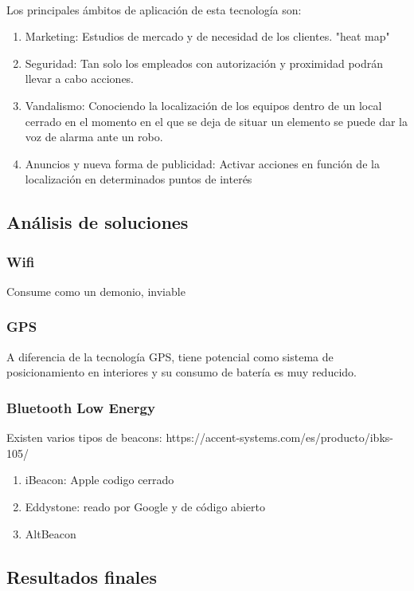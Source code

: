 \documentclass[a4paper ,12pt, onecolumn]{article}
\begin{document}
        \paragraph{}
        Los principales ámbitos de aplicación de esta tecnología son:
        \begin{enumerate}
            \item Marketing: Estudios de mercado y de necesidad de los clientes. "heat map"
            \item Seguridad: Tan solo los empleados con autorización y proximidad podrán llevar a cabo acciones.
            \item Vandalismo: Conociendo la localización de los equipos dentro de un local cerrado en el momento 
            en el que se deja de situar un elemento se puede dar la voz de alarma ante un robo.
            \item Anuncios y nueva forma de publicidad: Activar acciones en función de la localización en determinados puntos de interés
        \end{enumerate}
    \subsection{Análisis de soluciones}
        \subsubsection {Wifi}
        Consume como un demonio, inviable 
        \subsubsection {GPS}
        A diferencia de la tecnología GPS, tiene potencial como sistema de posicionamiento en interiores y su consumo de batería es muy reducido.

        \subsubsection {Bluetooth Low Energy}
        Existen varios tipos de beacons:
        https://accent-systems.com/es/producto/ibks-105/
        \begin{enumerate}
            \item iBeacon: Apple codigo cerrado
            \item Eddystone: reado por Google y de código abierto
            \item AltBeacon
        \end{enumerate}
    \subsection{Resultados finales}
\end{document}
